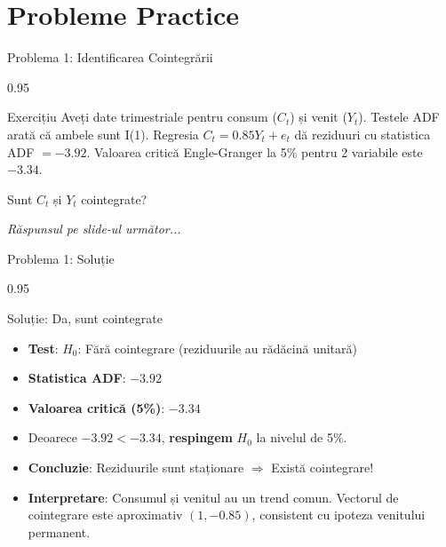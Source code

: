 \documentclass[9pt, aspectratio=169, t]{beamer}
\begin{document}
\section{Probleme Practice}

\begin{frame}{Problema 1: Identificarea Cointegrării}
    \begin{cminipage}{0.95\textwidth}
    \begin{block}{Exercițiu}
        Aveți date trimestriale pentru consum ($C_t$) și venit ($Y_t$). Testele ADF arată că ambele sunt I(1). Regresia $C_t = 0.85 Y_t + e_t$ dă reziduuri cu statistica ADF $= -3.92$. Valoarea critică Engle-Granger la 5\% pentru 2 variabile este $-3.34$.

        \vspace{0.2cm}
        Sunt $C_t$ și $Y_t$ cointegrate?
    \end{block}

    \vspace{0.5cm}
    \begin{flushright}\textit{Răspunsul pe slide-ul următor...}\end{flushright}
    \end{cminipage}
\end{frame}

\begin{frame}{Problema 1: Soluție}
    \begin{cminipage}{0.95\textwidth}
    \begin{exampleblock}{Soluție: Da, sunt cointegrate}
        \begin{itemize}\setlength{\itemsep}{0pt}
            \item \textbf{Test}: $H_0$: Fără cointegrare (reziduurile au rădăcină unitară)
            \item \textbf{Statistica ADF}: $-3.92$
            \item \textbf{Valoarea critică (5\%)}: $-3.34$
            \item Deoarece $-3.92 < -3.34$, \textbf{respingem} $H_0$ la nivelul de 5\%.
            \item \textbf{Concluzie}: Reziduurile sunt staționare $\Rightarrow$ Există cointegrare!
            \item \textbf{Interpretare}: Consumul și venitul au un trend comun. Vectorul de cointegrare este aproximativ $(1, -0.85)$, consistent cu ipoteza venitului permanent.
        \end{itemize}
    \end{exampleblock}
    \end{cminipage}
\end{frame}
\end{document}
